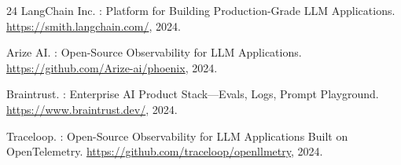 \documentclass[sigconf,nonacm]{acmart}
\begin{document}
\begin{thebibliography}{24}
{LangChain Inc.}
: Platform for Building Production-Grade {LLM} Applications.
\newblock \url{https://smith.langchain.com/}, 2024.

{Arize AI}.
: Open-Source Observability for {LLM} Applications.
\newblock \url{https://github.com/Arize-ai/phoenix}, 2024.

{Braintrust}.
: Enterprise {AI} Product Stack---Evals, Logs, Prompt
  Playground.
\newblock \url{https://www.braintrust.dev/}, 2024.

{Traceloop}.
: Open-Source Observability for {LLM} Applications
  Built on {OpenTelemetry}.
\newblock \url{https://github.com/traceloop/openllmetry}, 2024.

\end{thebibliography}
\end{document}

